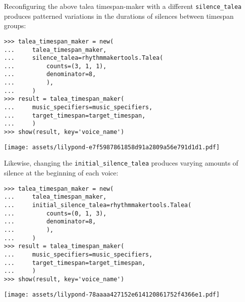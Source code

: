 \noindent Reconfiguring the above talea timespan-maker with a different
\texttt{silence\_talea} produces patterned variations in the durations of
silences between timespan groups:

\begin{comment}
<abjad>
talea_timespan_maker = new(
    talea_timespan_maker,
    silence_talea=rhythmmakertools.Talea(
        counts=(3, 1, 1),
        denominator=8,
        ),
    )
result = talea_timespan_maker(
    music_specifiers=music_specifiers,
    target_timespan=target_timespan,
    )
show(result, key='voice_name')
</abjad>
\end{comment}

\begin{singlespacing}
\vspace{-0.5\baselineskip}
\begin{lstlisting}
>>> talea_timespan_maker = new(
...     talea_timespan_maker,
...     silence_talea=rhythmmakertools.Talea(
...         counts=(3, 1, 1),
...         denominator=8,
...         ),
...     )
>>> result = talea_timespan_maker(
...     music_specifiers=music_specifiers,
...     target_timespan=target_timespan,
...     )
>>> show(result, key='voice_name')
\end{lstlisting}
\noindent\texttt{[image: assets/lilypond-e7f5987861858d91a2809a56e791d1d1.pdf]}
\end{singlespacing}

\noindent Likewise, changing the \texttt{initial\_silence\_talea} produces
varying amounts of silence at the beginning of each voice:

\begin{comment}
<abjad>
talea_timespan_maker = new(
    talea_timespan_maker,
    initial_silence_talea=rhythmmakertools.Talea(
        counts=(0, 1, 3),
        denominator=8,
        ),
    )
result = talea_timespan_maker(
    music_specifiers=music_specifiers,
    target_timespan=target_timespan,
    )
show(result, key='voice_name')
</abjad>
\end{comment}

\begin{singlespacing}
\vspace{-0.5\baselineskip}
\begin{lstlisting}
>>> talea_timespan_maker = new(
...     talea_timespan_maker,
...     initial_silence_talea=rhythmmakertools.Talea(
...         counts=(0, 1, 3),
...         denominator=8,
...         ),
...     )
>>> result = talea_timespan_maker(
...     music_specifiers=music_specifiers,
...     target_timespan=target_timespan,
...     )
>>> show(result, key='voice_name')
\end{lstlisting}
\noindent\texttt{[image: assets/lilypond-78aaaa427152e614120861752f4366e1.pdf]}
\end{singlespacing}

